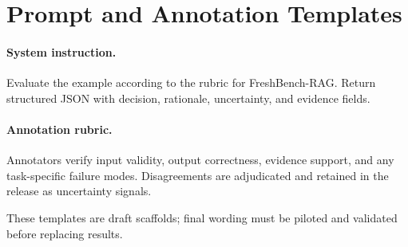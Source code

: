 \section{Prompt and Annotation Templates}
\paragraph{System instruction.} Evaluate the example according to the rubric for FreshBench-RAG. Return structured JSON with decision, rationale, uncertainty, and evidence fields.

\paragraph{Annotation rubric.} Annotators verify input validity, output correctness, evidence support, and any task-specific failure modes. Disagreements are adjudicated and retained in the release as uncertainty signals.

These templates are draft scaffolds; final wording must be piloted and validated before replacing \syntheticlabel{} results.

